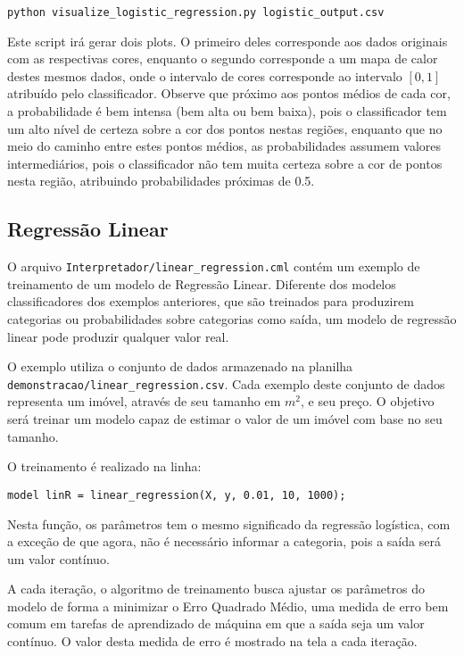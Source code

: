 \documentclass[12pt]{article}
\begin{document}
\begin{verbatim}
python visualize_logistic_regression.py logistic_output.csv
\end{verbatim}

Este script irá gerar dois plots. O primeiro deles corresponde aos dados originais com as respectivas cores, enquanto o segundo corresponde a um mapa de calor destes mesmos dados, onde o intervalo de cores corresponde ao intervalo $[0,1]$ atribuído pelo classificador. Observe que próximo aos pontos médios de cada cor, a probabilidade é bem intensa (bem alta ou bem baixa), pois o classificador tem um alto nível de certeza sobre a cor dos pontos nestas regiões, enquanto que no meio do caminho entre estes pontos médios, as probabilidades assumem valores intermediários, pois o classificador não tem muita certeza sobre a cor de pontos nesta região, atribuindo probabilidades próximas de 0.5.

\subsection{Regressão Linear}

O arquivo \texttt{Interpretador/linear\_regression.cml} contém um exemplo de treinamento de um modelo de Regressão Linear. Diferente dos modelos classificadores dos exemplos anteriores, que são treinados para produzirem categorias ou probabilidades sobre categorias como saída, um modelo de regressão linear pode produzir qualquer valor real.

O exemplo utiliza o conjunto de dados armazenado na planilha \\ \texttt{demonstracao/linear\_regression.csv}. Cada exemplo deste conjunto de dados representa um imóvel, através de seu tamanho em $m^2$, e seu preço. O objetivo será treinar um modelo capaz de estimar o valor de um imóvel com base no seu tamanho.

O treinamento é realizado na linha:

\begin{verbatim}
model linR = linear_regression(X, y, 0.01, 10, 1000);
\end{verbatim}

Nesta função, os parâmetros tem o mesmo significado da regressão logística, com a exceção de que agora, não é necessário informar a categoria, pois a saída será um valor contínuo.

A cada iteração, o algoritmo de treinamento busca ajustar os parâmetros do modelo de forma a minimizar o Erro Quadrado Médio, uma medida de erro bem comum em tarefas de aprendizado de máquina em que a saída seja um valor contínuo. O valor desta medida de erro é mostrado na tela a cada iteração.
\end{document}
